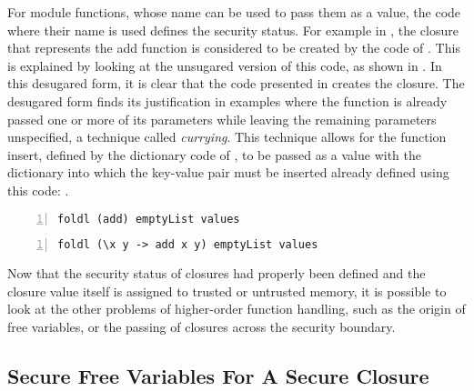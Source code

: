 \documentclass[10pt,a4paper,master=cws, masteroption=ai,english,inputenc=utf8]{kulemt}
\begin{document}
For module functions, whose name can be used to pass them as a value, the code where their name is used defines the security status.
For example in , the closure that represents the add function is considered to be created by the code of .
This is explained by looking at the unsugared version of this code, as shown in .
In this desugared form, it is clear that the code presented in  creates the closure.
The desugared form finds its justification in examples where the function is already passed one or more of its parameters while leaving the remaining parameters unspecified, a technique called \emph{currying}.
This technique allows for the function insert, defined by the dictionary code of , to be passed as a value with the dictionary into which the key-value pair must be inserted already defined using this code: .

\begin{lstlisting}[frame=single, language=ML,caption=Passing a predefined function., label=code:implicit,numbers=left]
foldl (add) emptyList values
\end{lstlisting}

\begin{lstlisting}[frame=single, language=ML,caption={Passing a predefined function, unsugared.}, label=code:explicit,numbers=left]
foldl (\x y -> add x y) emptyList values
\end{lstlisting}

Now that the security status of closures had properly been defined and the closure value itself is assigned to trusted or untrusted memory, it is possible to look at the other problems of higher-order function handling, such as the origin of free variables, or the passing of closures across the security boundary.





\subsection{Secure Free Variables For A Secure Closure}
\end{document}
